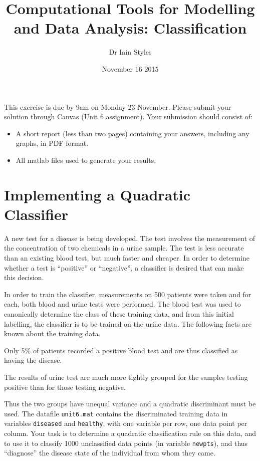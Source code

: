 \documentclass[12pt,a4paper]{tufte-handout}
\title{Computational Tools for Modelling and Data Analysis: Classification}
\date{November 16 2015}
\author{Dr Iain Styles}
\begin{document}
\maketitle
This exercise is due by 9am on Monday 23 November. Please submit your solution 
through Canvas (Unit 6 assignment). Your submission should consist of:
\begin{itemize}
  \item A short report (less than two pages) containing your answers, including  any graphs, in PDF format.
  \item All matlab files used to generate your results.
\end{itemize}

\section{Implementing a Quadratic Classifier}
A new test for a disease is being developed. The test involves the measurement of the concentration of two chemicals in a urine sample. The test is less accurate than an existing blood test, but much faster and cheaper. In order to determine whether a test is ``positive'' or ``negative'', a classifier is desired that can make this decision.

In order to train the classifier, measurements on 500 patients were taken and for each, both blood and urine tests were performed. The blood test was used to canonically determine the class of these training data, and from this initial labelling, the classifier is to be trained on the urine data. The following facts are known about the training data.
\begin{asparaitem}
  \item Only 5\% of patients recorded a positive blood test and are thus classified as having the disease.
  \item The results of urine test are much more tightly grouped for the samples testing positive than for those testing negative.
\end{asparaitem}

Thus the two groups have unequal variance and a quadratic discriminant must be used. The datafile \texttt{unit6.mat} contains the discriminated training data in variables \texttt{diseased} and \texttt{healthy}, with one variable per row, one data point per column. Your task is to determine a quadratic classification rule on this data, and to use it to classify 1000 unclassified data points (in variable \texttt{newpts}), and thus ``diagnose'' the disease state of the individual from whom they came. 
\end{document}

